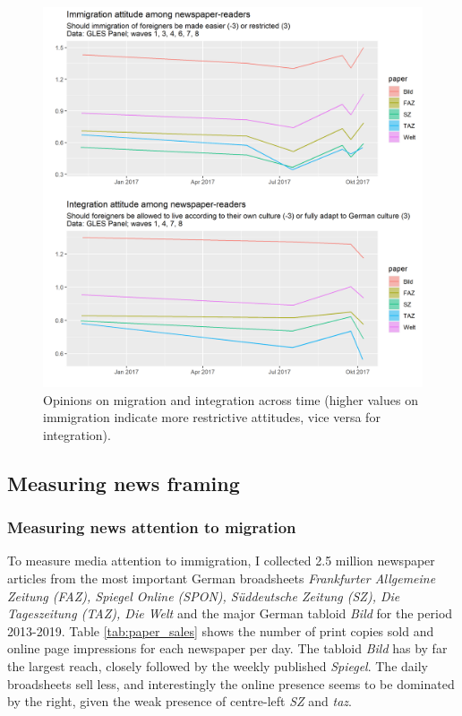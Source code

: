 \documentclass{article}
\begin{document}
\begin{figure}[!ht]
    \centering
    \includegraphics[width=\textwidth]{paper/vis/issues_readers.png}
    \caption{Opinions on migration and integration across time (higher values on immigration indicate more restrictive attitudes, vice versa for integration).}
    \label{fig:issues}
\end{figure}


\subsection{Measuring news framing}

\subsubsection{Measuring news attention to migration}


To measure media attention to immigration, I collected 2.5 million newspaper articles from the most important German broadsheets \textit{Frankfurter Allgemeine Zeitung (FAZ), Spiegel Online (SPON), Süddeutsche Zeitung (SZ), Die Tageszeitung (TAZ), Die Welt} and the major German tabloid \textit{Bild} for the period 2013-2019. Table \ref{tab:paper_sales} shows the number of print copies sold and online page impressions for each newspaper per day. The tabloid \textit{Bild} has by far the largest reach, closely followed by the weekly published \textit{Spiegel}. The daily broadsheets sell less, and interestingly the online presence seems to be dominated by the right, given the weak presence of centre-left \textit{SZ} and \textit{taz}.
\end{document}
